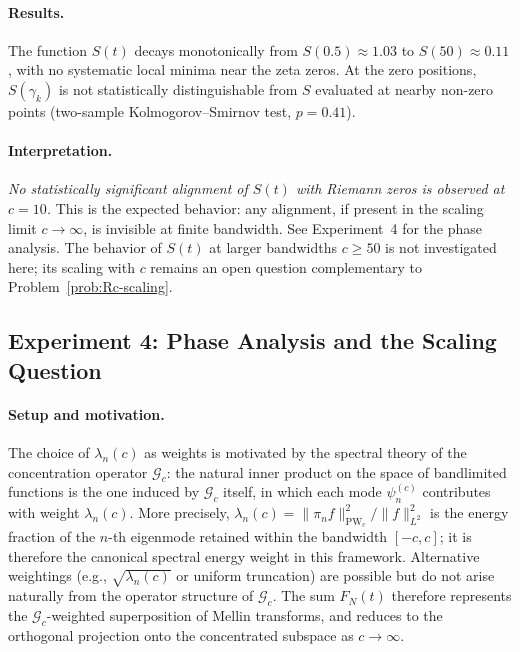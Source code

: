 \documentclass[12pt,a4paper]{amsart}
\theoremstyle{definition}
\newcommand{\Gc}{\mathcal{G}_c}
\begin{document}
\paragraph{Results.}
The function $S(t)$ decays monotonically from $S(0.5) \approx 1.03$
to $S(50) \approx 0.11$, with no systematic local minima near the
zeta zeros. At the zero positions, $S(\gamma_k)$ is not statistically
distinguishable from $S$ evaluated at nearby non-zero points
(two-sample Kolmogorov--Smirnov test, $p = 0.41$).

\paragraph{Interpretation.}
\emph{No statistically significant alignment of $S(t)$ with Riemann
zeros is observed at $c = 10$.} This is the expected behavior:
any alignment, if present in the scaling limit $c \to \infty$,
is invisible at finite bandwidth. See Experiment~4 for the phase
analysis. The behavior of $S(t)$ at larger bandwidths $c \geq 50$
is not investigated here; its scaling with $c$ remains an open
question complementary to Problem~\ref{prob:Rc-scaling}.

\subsection{Experiment 4: Phase Analysis and the Scaling Question}
\label{ssec:exp4}

\paragraph{Setup and motivation.}
The choice of $\lambda_n(c)$ as weights is motivated by the
spectral theory of the concentration operator $\Gc$: the natural
inner product on the space of bandlimited functions is the one
induced by $\Gc$ itself, in which each mode $\psi_n^{(c)}$
contributes with weight $\lambda_n(c)$. More precisely,
$\lambda_n(c) = \|\pi_n f\|^2_{\mathrm{PW}_c} / \|f\|^2_{L^2}$
is the energy fraction of the $n$-th eigenmode retained within
the bandwidth $[-c,c]$; it is therefore the canonical spectral
energy weight in this framework. Alternative weightings
(e.g., $\sqrt{\lambda_n(c)}$ or uniform truncation) are possible
but do not arise naturally from the operator structure of $\Gc$.
The sum $F_N(t)$ therefore represents the $\Gc$-weighted
superposition of Mellin transforms, and reduces to the orthogonal
projection onto the concentrated subspace as $c \to \infty$.
\end{document}
